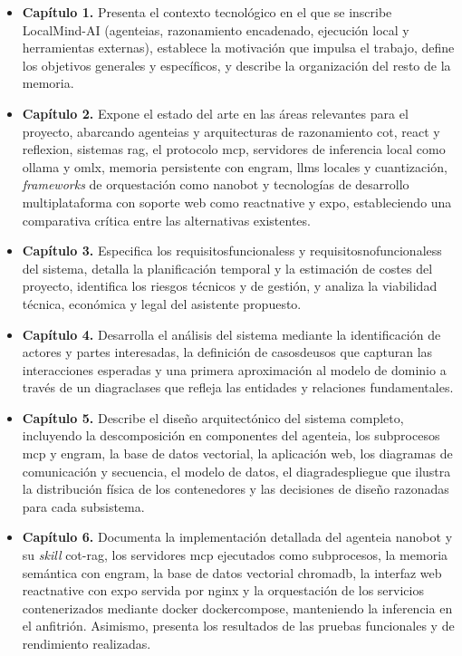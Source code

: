 \begin{itemize}
    \item \textbf{Capítulo 1.} Presenta el contexto tecnológico en el que se inscribe LocalMind-AI (\glspl{agenteia}, razonamiento encadenado, ejecución local y herramientas externas), establece la motivación que impulsa el trabajo, define los objetivos generales y específicos, y describe la organización del resto de la memoria.

    \item \textbf{Capítulo 2.} Expone el estado del arte en las áreas relevantes para el proyecto, abarcando \glspl{agenteia} y arquitecturas de razonamiento \gls{cot}, \gls{react} y \gls{reflexion}, sistemas \gls{rag}, el protocolo \gls{mcp}, servidores de inferencia local como \gls{ollama} y \gls{omlx}, memoria persistente con \gls{engram}, \glspl{llm} locales y cuantización, \textit{frameworks} de orquestación como \gls{nanobot} y tecnologías de desarrollo multiplataforma con soporte web como \gls{reactnative} y \gls{expo}, estableciendo una comparativa crítica entre las alternativas existentes.

    \item \textbf{Capítulo 3.} Especifica los \glspl{requisitosfuncionales} y \glspl{requisitosnofuncionales} del sistema, detalla la planificación temporal y la estimación de costes del proyecto, identifica los riesgos técnicos y de gestión, y analiza la viabilidad técnica, económica y legal del asistente propuesto.

    \item \textbf{Capítulo 4.} Desarrolla el análisis del sistema mediante la identificación de actores y partes interesadas, la definición de \glspl{casosdeuso} que capturan las interacciones esperadas y una primera aproximación al modelo de dominio a través de un \gls{diagraclases} que refleja las entidades y relaciones fundamentales.

    \item \textbf{Capítulo 5.} Describe el diseño arquitectónico del sistema completo, incluyendo la descomposición en componentes del \gls{agenteia}, los subprocesos \gls{mcp} y \gls{engram}, la base de datos vectorial, la aplicación web, los diagramas de comunicación y secuencia, el modelo de datos, el \gls{diagradespliegue} que ilustra la distribución física de los contenedores y las decisiones de diseño razonadas para cada subsistema.

    \item \textbf{Capítulo 6.} Documenta la implementación detallada del \gls{agenteia} \gls{nanobot} y su \textit{skill} \gls{cot}-\gls{rag}, los servidores \gls{mcp} ejecutados como subprocesos, la memoria semántica con \gls{engram}, la base de datos vectorial \gls{chromadb}, la interfaz web \gls{reactnative} con \gls{expo} servida por \gls{nginx} y la orquestación de los servicios contenerizados mediante \gls{docker} \gls{dockercompose}, manteniendo la inferencia en el anfitrión. Asimismo, presenta los resultados de las pruebas funcionales y de rendimiento realizadas.


\end{itemize}
